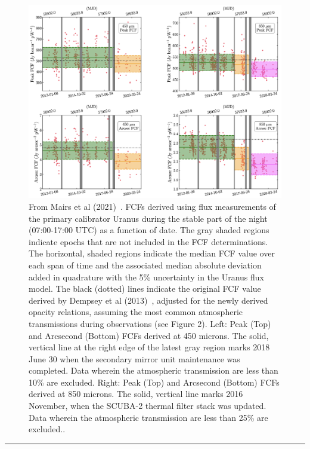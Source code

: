 \begin{center}
\begin{figure}
\includegraphics[width=0.9\linewidth]{sc21_FCFstep}
\caption[FCF step function]{From Mairs et al (2021)~\cite{mairs21}. FCFs derived using flux measurements of the primary calibrator Uranus during the stable part of the night (07:00-17:00 UTC) as a function of date. The gray shaded regions indicate epochs that are not included in the FCF determinations. The horizontal, shaded regions indicate the median FCF value over each span of time and the associated median absolute deviation added in quadrature with the 5\% uncertainty in the Uranus flux model. The black (dotted) lines indicate the original FCF value derived by Dempsey et al (2013)~\cite{dempsey12}, adjusted for the newly derived opacity relations, assuming the most common atmospheric transmissions during observations (see Figure 2). Left: Peak (Top) and Arcsecond (Bottom) FCFs derived at 450 microns. The solid, vertical line at the right edge of the latest gray region marks 2018 June 30 when the secondary mirror unit maintenance was completed. Data wherein the atmospheric transmission are less than 10\% are excluded. Right: Peak (Top) and Arcsecond (Bottom) FCFs derived at 850 microns. The solid, vertical line marks 2016 November, when the SCUBA-2 thermal filter stack was updated. Data wherein the atmospheric transmission are less than 25\% are excluded..}
\label{fig:FCFstep}
\end{figure}
\end{center}

\rule{1.0\textwidth}{2pt}

